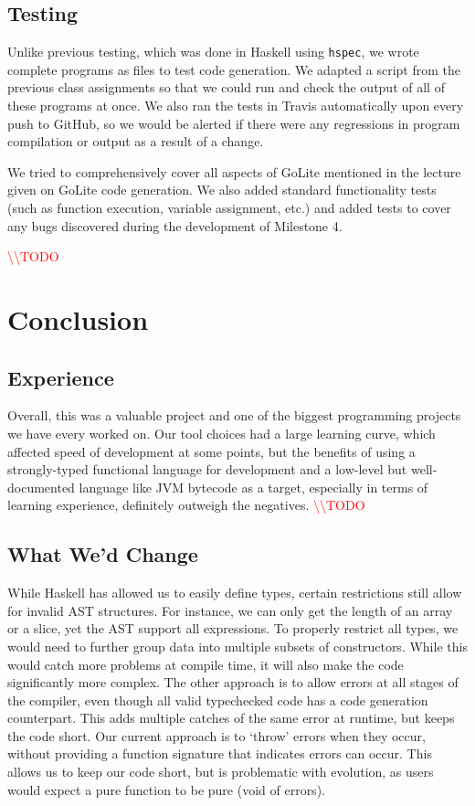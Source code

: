 \documentclass[11pt]{article}
\newcommand{\todo}[0]{\textcolor{red}{\textbackslash\textbackslash TODO \ }}
\begin{document}
\subsection{Testing} %
Unlike previous testing, which was done in Haskell using \texttt{hspec}, we
wrote complete programs as files to test code generation. We adapted a
script from the previous class assignments so that we could run and check
the output of all of these programs at once. We also ran the tests in
Travis automatically upon every push to GitHub, so we would be alerted if
there were any regressions in program compilation or output as a result of
a change.

We tried to comprehensively cover all aspects of GoLite mentioned in the
lecture given on GoLite code generation. We also added standard functionality
tests (such as function execution, variable assignment, etc.) and added tests
to cover any bugs discovered during the development of Milestone 4.

\todo

\section{Conclusion}
\subsection{Experience}
Overall, this was a valuable project and one of the biggest programming projects
we have every worked on. Our tool choices had a large learning curve, which
affected speed of development at some points, but the benefits of using a
strongly-typed functional language for development and a low-level but
well-documented language like JVM bytecode as a target, especially in terms of
learning experience, definitely outweigh the negatives. \todo

\subsection{What We'd Change}

While Haskell has allowed us to easily define types, certain
restrictions still allow for invalid AST structures.  For instance, we
can only get the length of an array or a slice, yet the AST support
all expressions.  To properly restrict all types, we would need to
further group data into multiple subsets of constructors\cite{so:pattern/matching/subset}.  While this
would catch more problems at compile time, it will also make the code
significantly more complex.  The other approach is to allow errors at
all stages of the compiler, even though all valid typechecked code has
a code generation counterpart.  This adds multiple catches of the same error
at runtime, but keeps the code short.  Our current approach is to
`throw' errors when they occur, without providing a function signature
that indicates errors can occur.  This allows us to keep our code
short, but is problematic with evolution, as users would expect a pure
function to be pure (void of errors).
\end{document}
